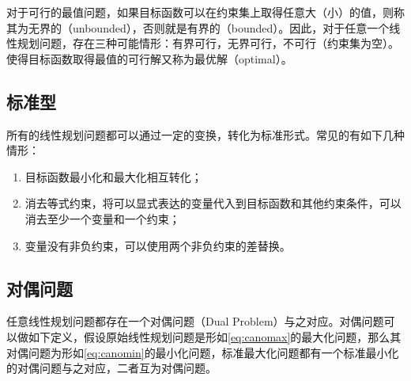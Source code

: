 对于可行的最值问题，如果目标函数可以在约束集上取得任意大（小）的值，则称其为无界的（unbounded），否则就是有界的（bounded）。因此，对于任意一个线性规划问题，存在三种可能情形：有界可行，无界可行，不可行（约束集为空）。使得目标函数取得最值的可行解又称为最优解（optimal）。

\subsection{标准型}
所有的线性规划问题都可以通过一定的变换，转化为标准形式。常见的有如下几种情形：
\begin{enumerate}[（1）]
  \item 目标函数最小化和最大化相互转化；
  \item 消去等式约束，将可以显式表达的变量代入到目标函数和其他约束条件，可以消去至少一个变量和一个约束；
  \item 变量没有非负约束，可以使用两个非负约束的差替换。
\end{enumerate}

\subsection{对偶问题}
任意线性规划问题都存在一个对偶问题（Dual Problem）与之对应。对偶问题可以做如下定义，假设原始线性规划问题是形如\eqref{eq:canomax}的最大化问题，那么其对偶问题为形如\eqref{eq:canomin}的最小化问题，标准最大化问题都有一个标准最小化的对偶问题与之对应，二者互为对偶问题。

